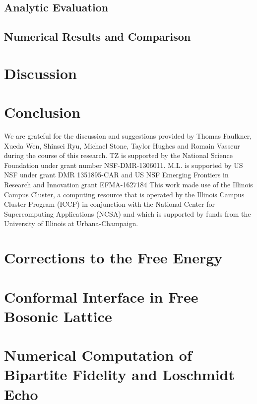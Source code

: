 \documentclass[reprint, prb]{revtex4-1}
\begin{document}
\subsection{Analytic Evaluation}
\label{sec_sub:analy_eval}

\subsection{Numerical Results and Comparison}


\section{Discussion}
\label{sec:disc}



\section{Conclusion}
\label{sec:conclusion}



\begin{acknowledgments}
We are grateful for the discussion and suggestions provided by Thomas Faulkner, Xueda Wen, Shinsei Ryu, Michael Stone, Taylor Hughes and Romain Vasseur during the course of this research. 
TZ is supported by the National Science Foundation under grant number NSF-DMR-1306011.
M.L. is supported by US NSF under grant DMR 1351895-CAR and US NSF Emerging Frontiers in Research and Innovation grant EFMA-1627184
This work made use of the Illinois Campus Cluster, a computing resource that is operated by the Illinois Campus Cluster Program (ICCP) in conjunction with the National Center for Supercomputing Applications (NCSA) and which is supported by funds from the University of Illinois at Urbana-Champaign.
\end{acknowledgments}

\appendix
\section{Corrections to the Free Energy}
\label{app:F_correction}


\section{Conformal Interface in Free Bosonic Lattice}
\label{app:interface_free_boson}


\section{Numerical Computation of Bipartite Fidelity and Loschmidt Echo}
\label{app:comp_fid_echo}

\end{document}
